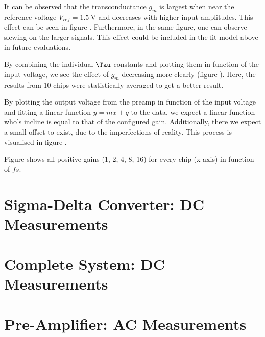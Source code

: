 It can  be  observed  that the transconductance $g_m$ is largest when near the
reference  voltage  $V_{ref}=\SI{1.5}{\volt}$  and decreases with higher input
amplitudes. This effect can  be seen in figure . Furthermore, in the same figure,  one can observe
slewing on the larger signals. This effect could be  included in the fit model
above in future evaluations.

By combining the individual  $\Tau$ constants and plotting them in function of
the  input voltage, we see the effect of $g_m$ decreasing more clearly (figure
).  Here,   the   results   from  10  chips  were
statistically averaged to get a better result.


By  plotting  the output voltage from the preamp  in  function  of  the  input
voltage and fitting a linear function $y=mx+q$ to the data, we expect a linear
function who's  incline is equal to that of the configured gain. Additionally,
there we expect a small offset to exist, due to the imperfections  of reality.
This  process  is   visualised   in   figure   .

Figure  shows all positive gains (1,  2,  4,  8,  16)  for
every chip (x axis) in function of $fs$.

\section{Sigma-Delta Converter: DC Measurements}
\label{sec:sigdelDC}

\section{Complete System: DC Measurements}
\label{sec:systemDC}

\section{Pre-Amplifier: AC Measurements}
\label{sec:preAmpAC}

